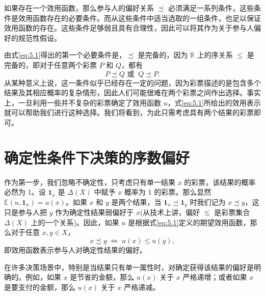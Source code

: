 如果存在一个效用函数，那么参与人的偏好关系 \(\precsim\) 必须满足一系列条件，这些条件是效用函数存在的必要条件。而从这些条件中适当选取的一组条件，也足以保证效用函数的存在。这些条件足够弱且具有合理性，因此可以将其作为关于参与人偏好的规范性假设。

由式\eqref{eq:5.1}得出的第一个必要条件是，\(\precsim\) 是完备的，因为 \(\mathbb{R}\) 上的序关系 \(\leq\) 是完备的，即对于任意两个彩票 \(P\) 和 \(Q\)，都有
\begin{equation}
\label{eq:5.7}
P \precsim Q\text{ 或 }~Q \precsim P.
\end{equation}
从某种意义上说，这一条件似乎已经存在一定的问题，因为彩票描述的是包含多个结果及其相应概率的复杂情形，因此人们可能很难在两个彩票之间作出选择。事实上，一旦利用一些并不复杂的彩票确定了效用函数 \(u\)，式\eqref{eq:5.1}所给出的效用表示就可以帮助我们进行这种选择。我们将看到，为此只需考虑具有两个结果的彩票即可。

\section{确定性条件下决策的序数偏好}\label{sec:5.5}
作为第一步，我们忽略不确定性，只考虑只有单一结果 \(x\) 的彩票，该结果的概率必然为 1。设 \({\mathbf{1}}_{x}\) 是 \(\Delta \left( X\right)\) 中赋予 \(x\) 概率为 1 的彩票。那么显然 \(\mathbb{E}\left( {u,{\mathbf{1}}_{x}}\right)  = u\left( x\right)\)。如果 \(x\) 和 \(y\) 是两个结果，当 \({\mathbf{1}}_{x} \precsim  {\mathbf{1}}_{y}\) 时我们记为 \(x \precsim  y\)，这只是参与人把 \(y\) 作为确定性结果弱偏好于 \(x\)(从技术上讲，偏好 \(\lesssim\) 是彩票集合 \(\Delta \left( X\right)\) 上的一个关系)。因此，如果 \(u\) 是根据式\eqref{eq:5.1}定义的期望效用函数，那么对于任意 \(x,y \in  X\)，
\begin{equation}
\label{eq:5.8}
x \precsim  y\; \Leftrightarrow  \;u\left( x\right)  \leq  u\left( y\right) ,
\end{equation}
即效用函数表示参与人对确定性结果的偏好。

在许多决策场景中，特别是当结果只有单一属性时，对确定获得该结果的偏好是明确的。例如，如果 \(x\) 是节省的金额，那么 \(u\left( x\right)\) 关于 \(x\) 严格递增；或者如果 \(x\) 是要支付的金额，那么 \(u\left( x\right)\) 关于 \(x\) 严格递减。

